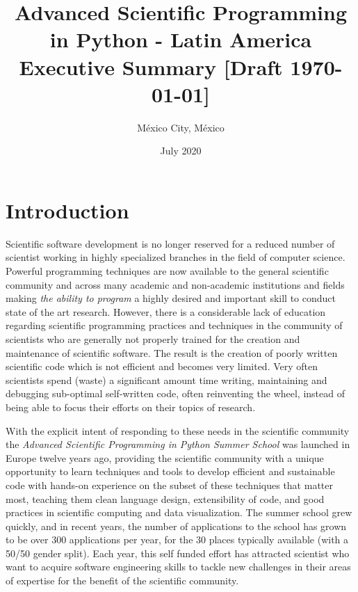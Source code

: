 \documentclass{article}[11pt]
\title{%
Advanced Scientific Programming in Python - Latin America
\\ \vspace{0.2cm}
\large Executive Summary  [Draft \today]}
\date{July 2020}
\author{M\'exico City, M\'exico}
\begin{document}
\maketitle

\begin{center}
\end{center}

\section*{Introduction}
Scientific software development is no longer reserved for a reduced number of
scientist working in highly specialized branches in the field of computer
science. Powerful programming techniques are now available to the general
scientific community and across many academic and non-academic institutions and
fields making \emph{the ability to program} a highly desired and important
skill to conduct state of the art research. However, there is a considerable
lack of education regarding scientific programming practices and techniques in
the community of scientists who are generally not properly trained for the
creation and maintenance of scientific software. The result is the creation of
poorly written scientific code which is not efficient and becomes very
limited. Very often scientists spend (waste) a significant amount time
writing, maintaining and debugging sub-optimal self-written code, often
reinventing the wheel, instead of being able to focus their efforts on their
topics of research.

With the explicit intent of responding to these needs in the scientific
community the \emph{Advanced Scientific Programming in Python Summer School}
was launched in Europe twelve years ago, providing the scientific community
with a unique opportunity to learn techniques and tools to develop  efficient
and sustainable code with hands-on experience on the subset of these techniques
that matter most, teaching them clean language design, extensibility of code,
and good practices in scientific computing and data visualization. The summer
school grew quickly, and in recent years, the number of applications  to the
school has grown to be over 300 applications per year, for the 30 places
typically available (with a 50/50 gender split). Each year, this self funded
effort has attracted scientist who want to acquire software  engineering skills
to tackle new challenges in their areas of expertise for the  benefit of the
scientific community.
\end{document}
